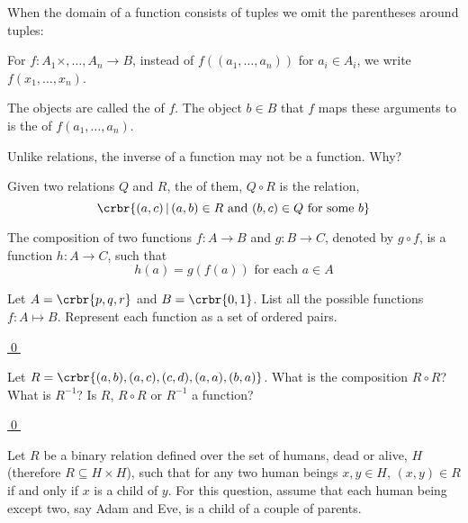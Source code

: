 \documentclass[11pt]{article}
\begin{document}
{ \item When the domain of a function consists of tuples we omit the parentheses
 around tuples: 
 
\item[] For $f: A_1\times,\ldots,A_n \rightarrow B$,
  instead of $f((a_1,\ldots,a_n))$ for $a_i\in A_i$, we write $f(x_1,\ldots,x_n)$.
 
\item[] The objects  are called the  of
$f$. The object $b\in B$ that $f$ maps these arguments to is the  of
$f(a_1,\ldots,a_n)$.


\hrulefill
\begin{uexercise}\label{ex-inverse}
Unlike relations, the inverse of a function may not be a function. Why?
\end{uexercise}
\hrulefill


\item Given two relations $Q$ and $R$,
the  of them, $Q\circ R$ is the relation,
\[
\crbr{(a,c)\,|\, (a,b) \in R \text{ and } (b,c) \in Q \text{ for some } b}
\]


\item The composition of two functions $f:A\rightarrow B$ and $g:B\rightarrow C$,
denoted by $g\circ f$, is a function $h:A \rightarrow C$, such that
\[
h(a) = g(f(a)) \text{ for each } a \in A
\]

\hrulefill
\begin{uexercise}\label{exfunclist}
 Let $A = \crbr{p,q,r}$ and $B = \crbr{0,1}$. List all the possible
functions $f: A \mapsto B$. Represent each function as a set of ordered pairs.

\hyperlink{exfunclistsol}{\qed}
\end{uexercise}

\begin{uexercise}\label{excompfunc}
Let $R=\crbr{(a,b),(a,c),(c,d),(a,a),(b,a)}$. What is the composition $R\circ
R$? What is $R^{-1}$? Is $R$, $R\circ R$ or $R^{-1}$ a function?

\hyperlink{excompfuncsol}{\qed}
\end{uexercise}


\begin{uexercise}\label{exhumans}
 Let $R$ be a binary relation defined over the set of humans, dead or alive, $H$
(therefore $R\subseteq H\times H$), such that for any two human beings $x,y \in
H$, $(x,y) \in R$ if and only if $x$ is a child of $y$. For this question,
assume that each human being except two, say Adam and Eve, is a child of a
couple of parents.


\end{uexercise}}
\end{document}
